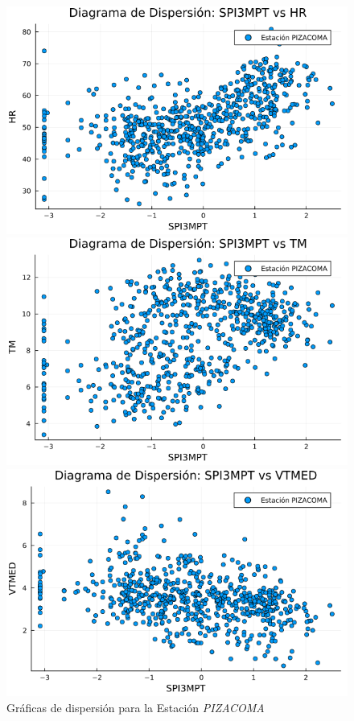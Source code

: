 \begin{figure}[htbp]
\centering
\caption{Gráficas de dispersión para la Estación \textit{PIZACOMA}}
\begin{minipage}{0.32\textwidth}
    \centering
    \includegraphics[width=\linewidth]{Capitulos/Scaterplot/PIZACOMA_SPI3MPT_vs_HR.png}
\end{minipage}\hfill
\begin{minipage}{0.32\textwidth}
    \centering
    \includegraphics[width=\linewidth]{Capitulos/Scaterplot/PIZACOMA_SPI3MPT_vs_TM.png}
\end{minipage}\hfill
\begin{minipage}{0.32\textwidth}
    \centering
    \includegraphics[width=\linewidth]{Capitulos/Scaterplot/PIZACOMA_SPI3MPT_vs_VTMED.png}

\end{minipage}
\end{figure}
